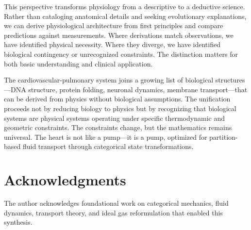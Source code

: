 \documentclass[12pt,a4paper]{article}
\theoremstyle{remark}
\begin{document}
This perspective transforms physiology from a descriptive to a deductive science. Rather than cataloging anatomical details and seeking evolutionary explanations, we can derive physiological architecture from first principles and compare predictions against measurements. Where derivations match observations, we have identified physical necessity. Where they diverge, we have identified biological contingency or unrecognized constraints. The distinction matters for both basic understanding and clinical application.

The cardiovascular-pulmonary system joins a growing list of biological structures—DNA structure, protein folding, neuronal dynamics, membrane transport—that can be derived from physics without biological assumptions. The unification proceeds not by reducing biology to physics but by recognizing that biological systems are physical systems operating under specific thermodynamic and geometric constraints. The constraints change, but the mathematics remains universal. The heart is not like a pump—it is a pump, optimized for partition-based fluid transport through categorical state transformations.

\section*{Acknowledgments}

The author acknowledges foundational work on categorical mechanics, fluid dynamics, transport theory, and ideal gas reformulation that enabled this synthesis.



\end{document}
